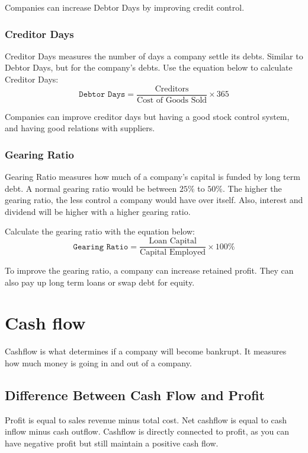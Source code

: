 \documentclass{standalone}
\begin{document}
Companies can increase Debtor Days by improving credit control.

\subsubsection{Creditor Days}
Creditor Days measures the number of days a company settle its debts.
Similar to Debtor Days, but for the company's debts.
Use the equation below to calculate Creditor Days:
\begin{equation}
    \texttt{Debtor Days} = \frac{\textrm{Creditors}}{\textrm{Cost of Goods Sold}} \times 365
\end{equation}

Companies can improve creditor days but having a good stock control system, and having good relations with suppliers.

\subsubsection{Gearing Ratio}
Gearing Ratio measures how much of a company's capital is funded by long term debt.
A normal gearing ratio would be between $25\%$ to $50\%$.
The higher the gearing ratio, the less control a company would have over itself.
Also, interest and dividend will be higher with a higher gearing ratio.

Calculate the gearing ratio with the equation below:
\begin{equation}
    \texttt{Gearing Ratio} = \frac{\textrm{Loan Capital}}{\textrm{Capital Employed}} \times 100\%
\end{equation}

To improve the gearing ratio, a company can increase retained profit.
They can also pay up long term loans or swap debt for equity.

\section{Cash flow}
Cashflow is what determines if a company will become bankrupt.
It measures how much money is going in and out of a company.

\subsection{Difference Between Cash Flow and Profit}
Profit is equal to sales revenue minus total cost.
Net cashflow is equal to cash inflow minus cash outflow.
Cashflow is directly connected to profit, as you can have negative profit but still maintain a positive cash flow.
\end{document}

